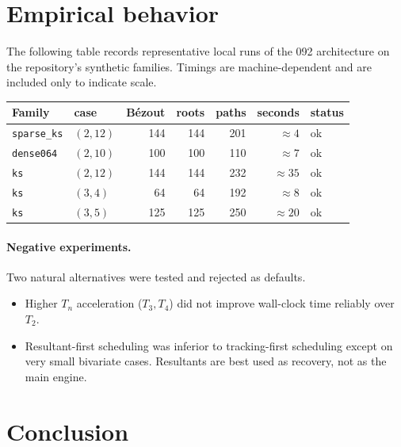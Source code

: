 \documentclass[11pt,a4paper]{article}
\theoremstyle{definition}
\theoremstyle{plain}
\theoremstyle{remark}
\begin{document}
\section{Empirical behavior}

The following table records representative local runs of the 092 architecture
on the repository's synthetic families.  Timings are machine-dependent and are
included only to indicate scale.

\begin{center}
\begin{tabular}{llrrrrl}
\toprule
Family & case & B\'ezout & roots & paths & seconds & status \\
\midrule
\texttt{sparse\_ks} & \((2,12)\) & 144 & 144 & 201 & \( \approx 4\) & ok \\
\texttt{dense064}   & \((2,10)\) & 100 & 100 & 110 & \( \approx 7\) & ok \\
\texttt{ks}         & \((2,12)\) & 144 & 144 & 232 & \( \approx 35\) & ok \\
\texttt{ks}         & \((3,4)\)  & 64  & 64  & 192 & \( \approx 8\) & ok \\
\texttt{ks}         & \((3,5)\)  & 125 & 125 & 250 & \( \approx 20\) & ok \\
\bottomrule
\end{tabular}
\end{center}

\paragraph{Negative experiments.}
Two natural alternatives were tested and rejected as defaults.
\begin{itemize}[leftmargin=2em]
  \item Higher \(T_n\) acceleration (\(T_3,T_4\)) did not improve wall-clock
  time reliably over \(T_2\).
  \item Resultant-first scheduling was inferior to tracking-first scheduling
  except on very small bivariate cases.  Resultants are best used as recovery,
  not as the main engine.
\end{itemize}

\section{Conclusion}
\end{document}
